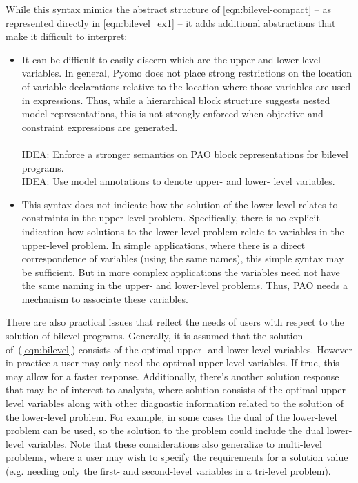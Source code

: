 While this syntax mimics the abstract structure of \eqref{eqn:bilevel-compact} -- as represented directly in \eqref{eqn:bilevel_ex1} --  it adds additional abstractions that make it difficult to interpret:
\begin{itemize}

\item It can be difficult to easily discern which are the upper and lower level variables.  In general, Pyomo does not place strong restrictions on the location of variable declarations relative to the location where those variables are used in expressions.  Thus, while a hierarchical block structure suggests nested model representations, this is not strongly enforced when objective and constraint expressions are generated.\\
\mbox{}\\
IDEA: Enforce a stronger semantics on PAO block representations for bilevel programs.\\
IDEA: Use model annotations to denote upper- and lower- level variables.\\

\item This syntax does not indicate how the solution of the lower level relates to constraints in the upper level problem.  Specifically, there is no explicit indication how solutions to the lower level problem relate to variables in the upper-level problem.  In simple applications, where there is a direct correspondence of variables (using the same names), this simple syntax may be sufficient.  But in more complex applications the variables need not have the same naming in the upper- and lower-level problems.  Thus, PAO needs a mechanism to associate these variables.

\end{itemize}

There are also practical issues that reflect the needs of users with
respect to the solution of bilevel programs.  Generally, it is assumed
that the solution of~(\ref{eqn:bilevel}) consists of the optimal upper-
and lower-level variables.  However in practice a user may only need
the optimal upper-level variables.  If true, this may allow for a
faster response.  Additionally, there's another solution response that
may be of interest to analysts, where solution consists of the optimal
upper-level variables along with other diagnostic information related
to the solution of the lower-level problem.  For example, in some cases
the dual of the lower-level problem can be used, so the solution to the
problem could include the dual lower-level variables.  Note that these
considerations also generalize to multi-level problems, where a user may
wish to specify the requirements for a solution value (e.g. needing only
the first- and second-level variables in a tri-level problem).

